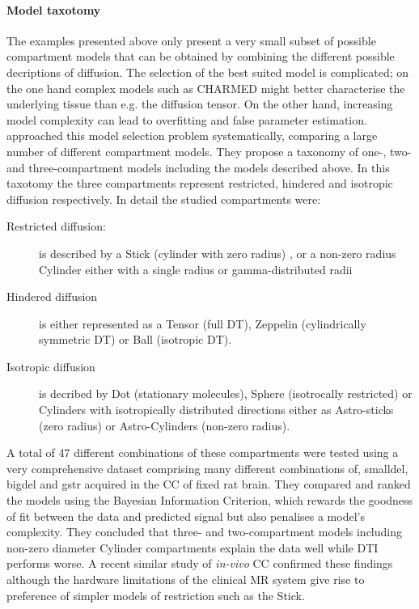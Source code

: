 \paragraph*{Model taxotomy}
The examples presented above only present a very small subset of possible compartment models that can be obtained by combining the different possible decriptions of diffusion. The selection of the best suited model is complicated; on the one hand complex models such as \gls{CHARMED} might better characterise the underlying tissue than e.g. the diffusion tensor. On the other hand, increasing model complexity can lead to overfitting and false parameter estimation. \citet{Panagiotaki:2012} approached this model selection problem systematically, comparing a large number of different compartment models. They propose a taxonomy of one-, two- and three-compartment models including the models described above. In this taxotomy the three compartments represent restricted, hindered and isotropic diffusion respectively. In detail the studied compartments were:
\begin{description}
	\item[Restricted diffusion:] is described by a Stick (cylinder with zero radius) , or a non-zero radius Cylinder either with a single radius or gamma-distributed radii
	\item[Hindered diffusion] is either represented as a Tensor (full \gls{DT}), Zeppelin (cylindrically symmetric \gls{DT}) or Ball  (isotropic \gls{DT}).  
	\item[Isotropic diffusion] is decribed by Dot (stationary molecules), Sphere (isotrocally restricted) or Cylinders with isotropically distributed directions either as Astro-sticks (zero radius)  or Astro-Cylinders (non-zero radius).
\end{description}


A total of 47 different combinations of these compartments were tested using a very comprehensive dataset comprising many different combinations of, \gls{smalldel}, \gls{bigdel} and \gls{gstr} acquired in the \gls{CC} of fixed rat brain. They compared and ranked the models using the Bayesian Information Criterion, which rewards the goodness of fit between the data and predicted signal but also penalises a model's complexity.  They concluded that three- and two-compartment models including non-zero diameter Cylinder compartments explain the data well while DTI performs worse. A recent similar study of \emph{in-vivo} \gls{CC} \citep{Ferizi:2012} confirmed these findings although the hardware limitations of the clinical MR system give rise to preference of simpler models of restriction such as the Stick.

